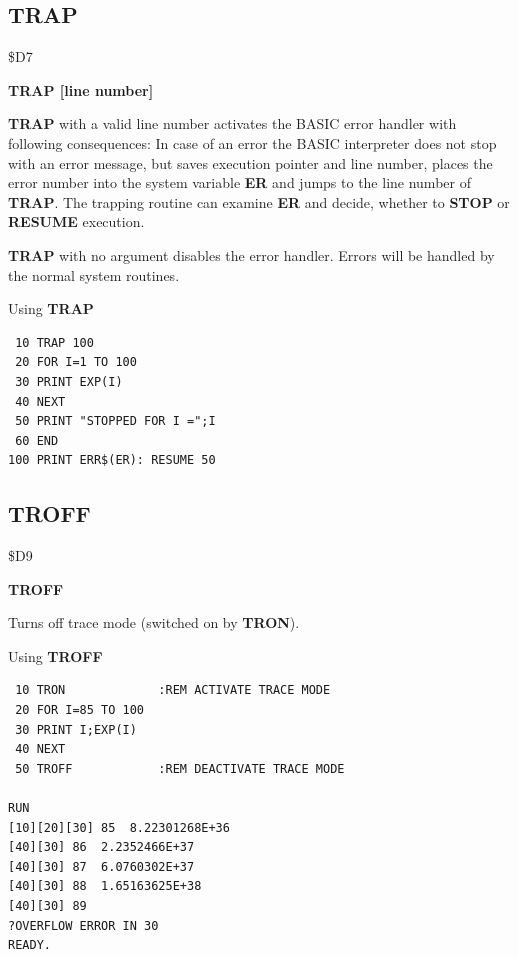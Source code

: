 \subsection{TRAP}
\begin{description}[leftmargin=2cm,style=nextline]
\item [Token:] \$D7
\item [Format:] {\bf TRAP [line number]}
\item [Usage:]  {\bf TRAP} with a valid line number activates the
                BASIC error handler with following consequences:
                In case of an error the BASIC interpreter does not
                stop with an error message, but saves execution
                pointer and line number, places the error number into the
                system variable {\bf ER} and jumps to the line number
                of {\bf TRAP}. The trapping routine can examine
                {\bf ER} and decide, whether to {\bf STOP}
                 or {\bf RESUME} execution.

                {\bf TRAP} with no argument disables the error handler.
                Errors will be handled by the normal system routines.

\item [Example:] Using {\bf TRAP}
\begin{tcolorbox}[colback=black,coltext=white]
\verbatimfont{\codefont}
\begin{verbatim}
 10 TRAP 100
 20 FOR I=1 TO 100
 30 PRINT EXP(I)
 40 NEXT
 50 PRINT "STOPPED FOR I =";I
 60 END
100 PRINT ERR$(ER): RESUME 50
\end{verbatim}
\end{tcolorbox}
\end{description}


\newpage
\subsection{TROFF}
\begin{description}[leftmargin=2cm,style=nextline]
\item [Token:] \$D9
\item [Format:] {\bf TROFF}
\item [Usage:]  Turns off trace mode (switched on by {\bf TRON}).

\item [Example:] Using {\bf TROFF}
\begin{tcolorbox}[colback=black,coltext=white]
\verbatimfont{\codefont}
\begin{verbatim}
 10 TRON             :REM ACTIVATE TRACE MODE
 20 FOR I=85 TO 100
 30 PRINT I;EXP(I)
 40 NEXT
 50 TROFF            :REM DEACTIVATE TRACE MODE

RUN
[10][20][30] 85  8.22301268E+36
[40][30] 86  2.2352466E+37
[40][30] 87  6.0760302E+37
[40][30] 88  1.65163625E+38
[40][30] 89
?OVERFLOW ERROR IN 30
READY.
\end{verbatim}
\end{tcolorbox}
\end{description}


